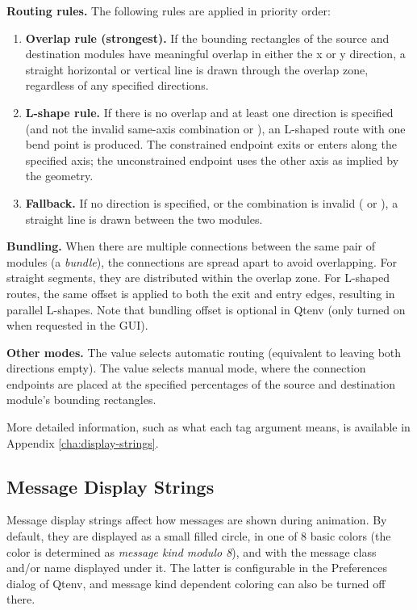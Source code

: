 \textbf{Routing rules.}
The following rules are applied in priority order:
\begin{enumerate}
  \item \textbf{Overlap rule (strongest).} If the bounding rectangles of the
    source and destination modules have meaningful overlap in either the x or
    y direction, a straight horizontal or vertical line is drawn through the
    overlap zone, regardless of any specified directions.
  \item \textbf{L-shape rule.} If there is no overlap and at least one
    direction is specified (and not the invalid same-axis combination
     or ), an L-shaped route with one bend point is
    produced. The constrained endpoint exits or enters along the specified
    axis; the unconstrained endpoint uses the other axis as implied by the
    geometry.
  \item \textbf{Fallback.} If no direction is specified, or the combination
    is invalid ( or ), a straight line is drawn between
    the two modules.
\end{enumerate}

\textbf{Bundling.}
When there are multiple connections between the same pair of modules
(a \textit{bundle}), the connections are spread apart to avoid overlapping.
For straight segments, they are distributed within the overlap zone.
For L-shaped routes, the same offset is applied to both the exit and entry
edges, resulting in parallel L-shapes. Note that bundling offset is optional
in Qtenv (only turned on when requested in the GUI).

\textbf{Other modes.}
The value  selects automatic routing (equivalent to leaving both
directions empty). The value
 selects manual
mode, where the connection endpoints are placed at the specified percentages
of the source and destination module's bounding rectangles.

More detailed information, such as what each tag argument means, is
available in Appendix \ref{cha:display-strings}.


\subsection{Message Display Strings}
\label{sec:graphics:message-displaystrings}

Message display strings affect how messages are shown during animation.
By default, they are displayed as a small filled circle, in one of
8 basic colors (the color is determined as \textit{message kind modulo 8}),
and with the message class and/or name displayed under it.
The latter is configurable in the Preferences dialog of Qtenv,
and message kind dependent coloring can also be turned off there.

